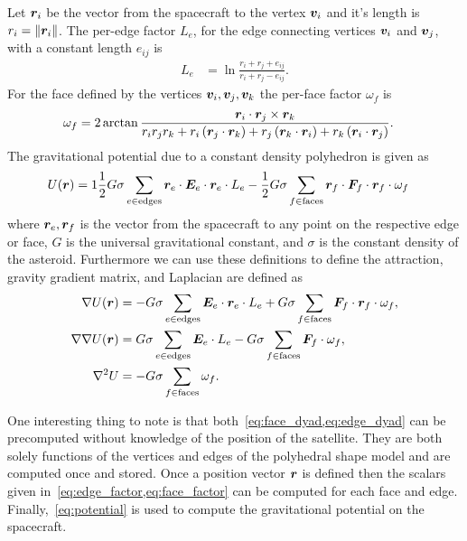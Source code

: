 \documentclass[]{aiaa-tc}%
\begin{document}
Let \( \bm{r}_i \) be the vector from the spacecraft to the vertex \( \bm{v}_i \) and it's length is \( r_i = \left\| \bm{r}_i \right\| \).
The per-edge factor \( L_e \), for the edge connecting vertices \( \bm{v}_i \) and \( \bm{v}_j \), with a constant length \( e_{ij} \) is
\begin{align}\label{eq:edge_factor}
    L_e &= \ln \frac{r_i + r_j + e_{ij}}{r_i + r_j - e_{ij}}.
\end{align}
For the face defined by the vertices \( \bm{v}_i, \bm{v}_j, \bm{v}_k \) the per-face factor \( \omega_f \) is
\begin{align}\label{eq:face_factor}
    \omega_f &= 2 \arctan \frac{\bm{r}_i \cdot \bm{r}_j \times \bm{r}_k}{r_i r_j r_k + r_i \left( \bm{r}_j \cdot \bm{r}_k \right) + r_j \left( \bm{r}_k \cdot \bm{r}_i \right) + r_k \left( \bm{r}_i \cdot \bm{r}_j \right)} .
\end{align}
The gravitational potential due to a constant density polyhedron is given as
\begin{align}\label{eq:potential}
    U(\bm{r}) &= 1\frac{1}{2} G \sigma \sum_{e \in \text{edges}} \bm{r}_e \cdot \bm{E}_e \cdot \bm{r}_e \cdot L_e - \frac{1}{2}G \sigma \sum_{f \in \text{faces}} \bm{r}_f \cdot \bm{F}_f \cdot \bm{r}_f \cdot \omega_f
\end{align}
where \( \bm{r}_e, \bm{r}_f \) is the vector from the spacecraft to any point on the respective edge or face, \( G\) is the universal gravitational constant, and \( \sigma \) is the constant density of the asteroid.
Furthermore we can use these definitions to define the attraction, gravity gradient matrix, and Laplacian are defined as
\begin{align}
    \nabla U ( \bm{r} ) &= -G \sigma \sum_{e \in \text{edges}} \bm{E}_e \cdot \bm{r}_e \cdot L_e + G \sigma \sum_{f \in \text{faces}} \bm{F}_f \cdot \bm{r}_f \cdot \omega_f , \label{eq:attraction}\\
    \nabla \nabla U ( \bm{r} ) &= G \sigma \sum_{e \in \text{edges}} \bm{E}_e  \cdot L_e - G \sigma \sum_{f \in \text{faces}} \bm{F}_f \cdot \omega_f , \label{eq:gradient_matrix}\\
    \nabla^2 U &= -G \sigma \sum_{f \in \text{faces}}  \omega_f \label{eq:laplacian}.
\end{align}

One interesting thing to note is that both~\cref{eq:face_dyad,eq:edge_dyad} can be precomputed without knowledge of the position of the satellite.
They are both solely functions of the vertices and edges of the polyhedral shape model and are computed once and stored.
Once a position vector \( \bm{r} \) is defined then the scalars given in~\cref{eq:edge_factor,eq:face_factor} can be computed for each face and edge.
Finally,~\cref{eq:potential} is used to compute the gravitational potential on the spacecraft.
\end{document}
